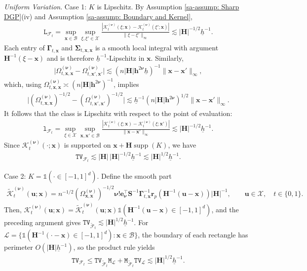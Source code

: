 \documentclass[10pt]{article}
\DeclareMathOperator{\supp}{supp}
\newcommand{\Indicator}{\mathds{1}}
\newcommand{\infnorm}[1]{\lVert #1 \rVert_{\infty}}
\newcommand{\be}{\mathbf{e}}
\newcommand{\bh}{\mathbf{h}}
\newcommand{\bH}{\mathbf{H}}
\newcommand{\br}{\mathbf{r}}
\newcommand{\bS}{\mathbf{S}}
\newcommand{\bu}{\mathbf{u}}
\newcommand{\bx}{\mathbf{x}}
\newcommand{\bnu}{\boldsymbol{\nu}}
\newcommand{\bGamma}{\boldsymbol{\Gamma}}
\newcommand{\bSigma}{\boldsymbol{\Sigma}}
\newcommand{\B}{\mathcal{B}}
\newcommand{\F}{\mathcal{F}}
\newcommand{\K}{\mathscr{K}}
\newcommand{\X}{\mathcal{X}}
\newcommand{\ttL}{\mathtt{L}}
\newcommand{\ttM}{\mathtt{M}}
\newcommand{\ttTV}{\mathtt{TV}}
\newcommand{\px}{\mathbf{x}'}
\begin{document}
\medskip\textit{Uniform Variation}. Case 1: $K$ is Lipschitz. By Assumption \ref{sa-assump: Sharp DGP}(iv) and Assumption \ref{sa-assump: Boundary and Kernel},
\begin{align*}
    \ttL_{\F_t}
    = \sup_{\bx \in \B}\sup_{\xi, \xi' \in \X} \frac{|\K_t^{(\bnu)}(\xi; \bx) - \K_t^{(\bnu)}(\xi'; \bx)|}{\infnorm{\xi - \xi'}}
    \lesssim |\bH|^{-1/2}\underline h^{-1}.
\end{align*}
Each entry of $\bGamma_{t,\bx}$ and $\bSigma_{t,\bx,\bx}$ is a smooth local integral with argument $\bH^{-1}(\xi-\bx)$ and is therefore $\underline h^{-1}$-Lipschitz in $\bx$. Similarly,
\begin{align*}
    \big|\Omega_{t,\bx,\bx}^{(\bnu)} - \Omega_{t,\px,\px}^{(\bnu)}\big|
    \lesssim (n|\bH|\bh^{2\bnu}\underline h)^{-1}\infnorm{\bx-\px},
\end{align*}
which, using $\Omega_{t,\bx,\bx}^{(\bnu)}\asymp(n|\bH|\bh^{2\bnu})^{-1}$, implies
\begin{align*}
    \big|(\Omega_{t,\bx,\bx}^{(\bnu)})^{-1/2} - (\Omega_{t,\px,\px}^{(\bnu)})^{-1/2}\big|
    \lesssim \underline h^{-1}(n|\bH|\bh^{2\bnu})^{1/2}\infnorm{\bx-\px}.
\end{align*}
It follows that the class is Lipschitz with respect to the point of evaluation:
\begin{align*}
    \mathtt{l}_{\F_t}
    = \sup_{\xi \in \X}\sup_{\bx, \px \in \B} \frac{\left|\K_t^{(\bnu)}(\xi; \bx) - \K_t^{(\bnu)}(\xi; \px) \right|}{\infnorm{\bx - \px}}
    \lesssim |\bH|^{-1/2}\underline h^{-1}.
\end{align*}
Since $\K_t^{(\bnu)}(\cdot;\bx)$ is supported on $\bx+\bH\supp(K)$, we have
\begin{align*}
    \ttTV_{\F_t}
    \lesssim |\bH| \, |\bH|^{-1/2}\underline h^{-1}
    \lesssim |\bH|^{1/2}\underline h^{-1}.
\end{align*}

Case 2: $K = \Indicator(\cdot \in [-1,1]^d)$. Define the smooth part
\begin{align*}
    \tilde{\K}^{(\bnu)}_t(\bu;\bx)
    = n^{-1/2} (\Omega_{\bx,\bx}^{(\bnu)})^{-1/2}\bnu!\be_{\bnu}^{\top} \bS^{-1} \bGamma_{t,\bx}^{-1} \br_p(\bH^{-1}(\bu - \bx)) |\bH|^{-1},
    \qquad \bu \in \X,\quad t \in \{0,1\}.
\end{align*}
Then, $\K_t^{(\bnu)}(\bu;\bx) = \tilde{\K}_t^{(\bnu)}(\bu;\bx)\Indicator(\bH^{-1}(\bu-\bx)\in[-1,1]^d)$, and the preceding argument gives $\ttTV_{\tilde{\F}_t}\lesssim |\bH|^{1/2}\underline h^{-1}$. For $\mathscr{L}=\{\Indicator(\bH^{-1}(\cdot-\bx)\in[-1,1]^d):\bx\in\B\}$, the boundary of each rectangle has perimeter $O(|\bH|\underline h^{-1})$, so the product rule yields
\begin{align*}
    \ttTV_{\F_t}
    \leq \ttTV_{\tilde{\F}_t}\ttM_{\mathscr{L}} + \ttM_{\tilde{\F}_t}\ttTV_{\mathscr{L}}
    \lesssim |\bH|^{1/2}\underline h^{-1}.
\end{align*}
\end{document}
